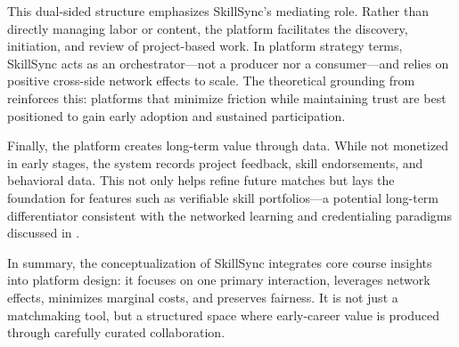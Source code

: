 \documentclass[12pt,a4paper]{article}
\begin{document}
This dual-sided structure emphasizes SkillSync’s mediating role. Rather than directly managing labor or content, the platform facilitates the discovery, initiation, and review of project-based work. In platform strategy terms, SkillSync acts as an orchestrator---not a producer nor a consumer---and relies on positive cross-side network effects to scale. The theoretical grounding from \citet{Reillier2017} reinforces this: platforms that minimize friction while maintaining trust are best positioned to gain early adoption and sustained participation.

Finally, the platform creates long-term value through data. While not monetized in early stages, the system records project feedback, skill endorsements, and behavioral data. This not only helps refine future matches but lays the foundation for features such as verifiable skill portfolios---a potential long-term differentiator consistent with the networked learning and credentialing paradigms discussed in \citet{Zuboff2019}.

In summary, the conceptualization of SkillSync integrates core course insights into platform design: it focuses on one primary interaction, leverages network effects, minimizes marginal costs, and preserves fairness. It is not just a matchmaking tool, but a structured space where early-career value is produced through carefully curated collaboration.

\newpage


\newpage


\end{document}
